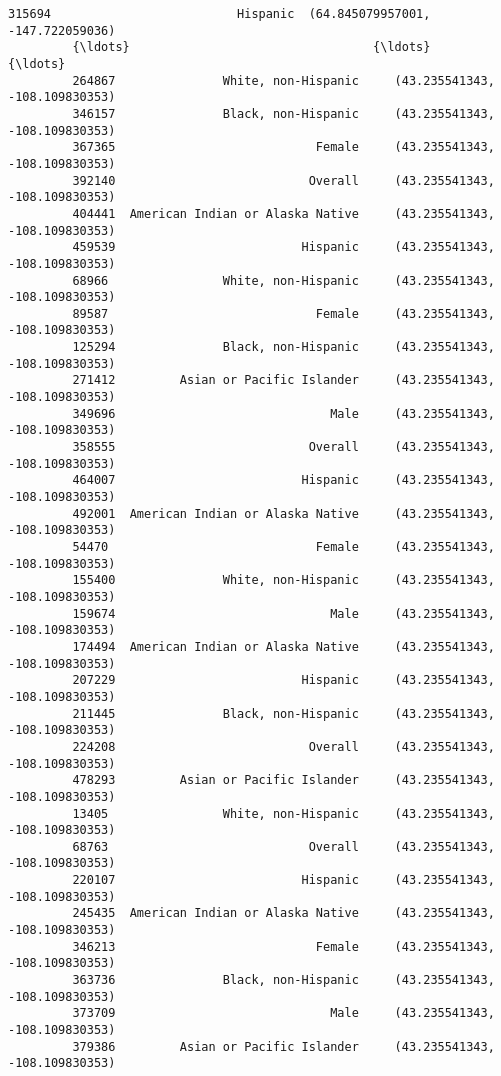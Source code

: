 \documentclass[11pt]{article}
\begin{document}
\begin{Verbatim}[commandchars=\\\{\}]
         315694                          Hispanic  (64.845079957001, -147.722059036)   
         {\ldots}                                  {\ldots}                                {\ldots}   
         264867               White, non-Hispanic     (43.235541343, -108.109830353)   
         346157               Black, non-Hispanic     (43.235541343, -108.109830353)   
         367365                            Female     (43.235541343, -108.109830353)   
         392140                           Overall     (43.235541343, -108.109830353)   
         404441  American Indian or Alaska Native     (43.235541343, -108.109830353)   
         459539                          Hispanic     (43.235541343, -108.109830353)   
         68966                White, non-Hispanic     (43.235541343, -108.109830353)   
         89587                             Female     (43.235541343, -108.109830353)   
         125294               Black, non-Hispanic     (43.235541343, -108.109830353)   
         271412         Asian or Pacific Islander     (43.235541343, -108.109830353)   
         349696                              Male     (43.235541343, -108.109830353)   
         358555                           Overall     (43.235541343, -108.109830353)   
         464007                          Hispanic     (43.235541343, -108.109830353)   
         492001  American Indian or Alaska Native     (43.235541343, -108.109830353)   
         54470                             Female     (43.235541343, -108.109830353)   
         155400               White, non-Hispanic     (43.235541343, -108.109830353)   
         159674                              Male     (43.235541343, -108.109830353)   
         174494  American Indian or Alaska Native     (43.235541343, -108.109830353)   
         207229                          Hispanic     (43.235541343, -108.109830353)   
         211445               Black, non-Hispanic     (43.235541343, -108.109830353)   
         224208                           Overall     (43.235541343, -108.109830353)   
         478293         Asian or Pacific Islander     (43.235541343, -108.109830353)   
         13405                White, non-Hispanic     (43.235541343, -108.109830353)   
         68763                            Overall     (43.235541343, -108.109830353)   
         220107                          Hispanic     (43.235541343, -108.109830353)   
         245435  American Indian or Alaska Native     (43.235541343, -108.109830353)   
         346213                            Female     (43.235541343, -108.109830353)   
         363736               Black, non-Hispanic     (43.235541343, -108.109830353)   
         373709                              Male     (43.235541343, -108.109830353)   
         379386         Asian or Pacific Islander     (43.235541343, -108.109830353)   
         

\end{Verbatim}
\end{document}
